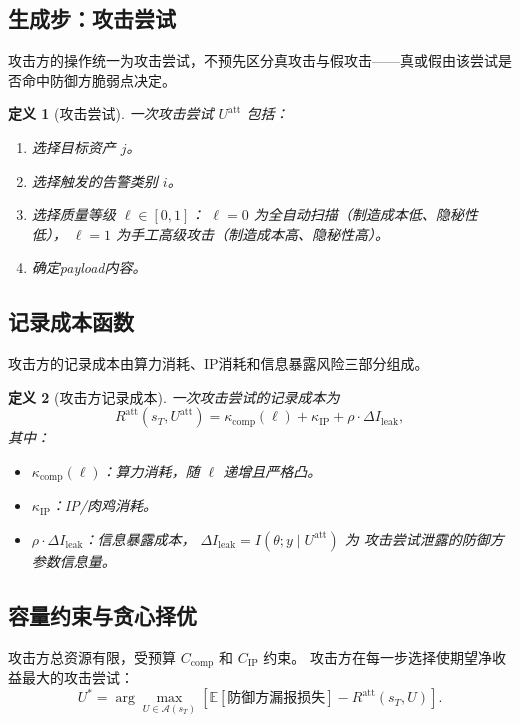 \documentclass[11pt,a4paper]{article}
\newtheorem{definition}{定义}[section]
\begin{document}
\subsection{生成步：攻击尝试}

攻击方的操作统一为攻击尝试，不预先区分真攻击与假攻击——真或假由该尝试是否命中防御方脆弱点决定。

\begin{definition}[攻击尝试]
一次攻击尝试 $U^{\text{att}}$ 包括：
\begin{enumerate}[label=(\arabic*)]
    \item 选择目标资产 $j$。
    \item 选择触发的告警类别 $i$。
    \item 选择质量等级 $\ell \in [0,1]$：
          $\ell = 0$ 为全自动扫描（制造成本低、隐秘性低），
          $\ell = 1$ 为手工高级攻击（制造成本高、隐秘性高）。
    \item 确定payload内容。
\end{enumerate}
\end{definition}

\subsection{记录成本函数}

攻击方的记录成本由算力消耗、IP消耗和信息暴露风险三部分组成。

\begin{definition}[攻击方记录成本]
一次攻击尝试的记录成本为
\[
R^{\text{att}}(s_T, U^{\text{att}}) = \kappa_{\text{comp}}(\ell) + \kappa_{\text{IP}} + \rho \cdot \Delta I_{\text{leak}},
\]
其中：
\begin{itemize}
    \item $\kappa_{\text{comp}}(\ell)$：算力消耗，随 $\ell$ 递增且严格凸。
    \item $\kappa_{\text{IP}}$：IP/肉鸡消耗。
    \item $\rho \cdot \Delta I_{\text{leak}}$：信息暴露成本，
          $\Delta I_{\text{leak}} = I(\theta; y \mid U^{\text{att}})$ 为
          攻击尝试泄露的防御方参数信息量。
\end{itemize}
\end{definition}

\subsection{容量约束与贪心择优}

攻击方总资源有限，受预算 $C_{\text{comp}}$ 和 $C_{\text{IP}}$ 约束。
攻击方在每一步选择使期望净收益最大的攻击尝试：
\[
U^* = \arg\max_{U \in \mathcal{A}(s_T)} \left[
\mathbb{E}[\text{防御方漏报损失}] - R^{\text{att}}(s_T, U) \right].
\]
\end{document}
